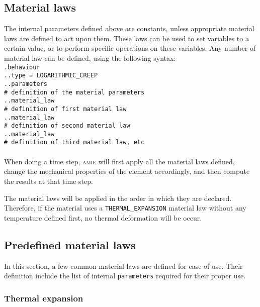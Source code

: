 \documentclass[10pt]{article}
\begin{document}
\subsection{Material laws}

The internal parameters defined above are constants, unless appropriate material laws are defined to act upon them. These laws can be used to set variables to a certain value, or to perform specific operations on these variables. Any number of material law can be defined, using the following syntax:\\

\noindent \verb+.behaviour+\\
\verb+..type = LOGARITHMIC_CREEP+\\
\verb+..parameters+\\
\verb+# definition of the material parameters+\\
\verb+..material_law+\\
\verb+# definition of first material law+\\
\verb+..material_law+\\
\verb+# definition of second material law+\\
\verb+..material_law+\\
\verb+# definition of third material law, etc+

\paragraph{} When doing a time step, \textsc{amie} will first apply all the material laws defined, change the mechanical properties of the element accordingly, and then compute the results at that time step.

The material laws will be applied in the order in which they are declared. Therefore, if the material uses a \verb+THERMAL_EXPANSION+ material law without any temperature defined first, no thermal deformation will be occur.

\subsection{Predefined material laws}

In this section, a few common material laws are defined for ease of use. Their definition include the list of internal \verb+parameters+ required for their proper use.

\subsubsection{Thermal expansion}
\end{document}
